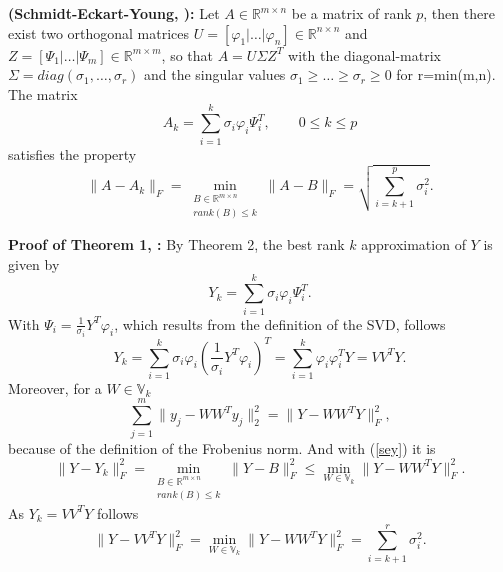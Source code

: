 \begin{mytheo}
  \textbf{(Schmidt-Eckart-Young, \cite[p.~118]{ROM_book2}):}
Let $A \in \mathbb{R}^{m \times n}$ be a matrix of rank $p$, then there exist two orthogonal matrices 
$U=[\varphi_1 | \dots | \varphi_n] \in \mathbb{R}^{n \times n}$ and
$Z=[\varPsi_1|\dots|\varPsi_m] \in \mathbb{R}^{m \times m}$, so that $A = U\Sigma Z^T$ with the diagonal-matrix 
$\Sigma = diag(\sigma_1,\dots,\sigma_r)$ and
the singular values $\sigma_1 \geq \dots \geq \sigma_r \geq 0$ for r=min(m,n).
The matrix
\begin{equation}
 A_k = \sum_{i=1}^k {\sigma_i \varphi_i \varPsi_i^T}, \qquad 0 \leq k \leq p
\end{equation}
satisfies the property
\begin{equation}\label{sey}
 \| A-A_k\|_F = \min_{\substack{B\in \mathbb{R}^{m \times n} \\ rank(B) \leq k}} \| A-B\|_F = \sqrt{\sum_{i=k+1}^p \sigma_i^2}.
\end{equation}
\end{mytheo}

\textbf{Proof of Theorem 1, \cite[p.~125]{ROM_book2}:}
By Theorem 2, the best rank $k$ approximation of $Y$ is given by
\begin{equation*}
 Y_k = \sum_{i=1}^k {\sigma_i \varphi_i \varPsi_i^T}.
 \end{equation*}
With $\varPsi_i = \frac{1}{\sigma_i}Y^T\varphi_i$, which results from the definition of the SVD, follows
\begin{equation*}
 Y_k = \sum_{i=1}^k {\sigma_i \varphi_i (\frac{1}{\sigma_i}Y^T\varphi_i)^T} 
 = \sum_{i=1}^k { \varphi_i \varphi_i^T Y} =VV^TY.
\end{equation*}
Moreover, for a $W \in \mathbb{V}_k$
\begin{equation*}
 \sum_{j=1}^m\parallel y_j - WW^Ty_j\parallel_2^2 
 = \parallel Y- WW^TY \parallel_F^2,
\end{equation*}
because of the definition of the Frobenius norm.
And with (\ref{sey}) it is
\begin{equation*}
 \| Y-Y_k\|_F^2 = \min_{\substack{B\in \mathbb{R}^{m \times n} \\ rank(B) \leq k}} \| Y-B\|_F^2 
 \leq \min_{W \in \mathbb{V}_k} \parallel Y - WW^TY\parallel_F^2.
\end{equation*}
As $Y_k = VV^TY$ follows
\begin{equation*}
\parallel Y - VV^TY\parallel_F^2 =
\min_{W \in \mathbb{V}_k} \parallel Y - WW^TY\parallel_F^2 = \sum_{i=k+1}^r \sigma^2_i.
\end{equation*}

